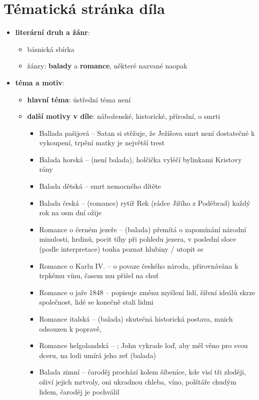 \documentclass[10pt,a4paper]{article}
\begin{document}
\section*{Tématická stránka díla}
\begin{itemize}
\item \textbf{literární druh a žánr}:
	\begin{itemize}
	\item básnická sbírka
	\item žánry: \textbf{balady} a \textbf{romance}, některé nazvané naopak
	\end{itemize}
\item \textbf{téma a motiv}:
	\begin{itemize}
	\item \textbf{hlavní téma}: ústřední téma není
	\item \textbf{další motivy v díle}: náboženské, historické, přírodní, o smrti
		\begin{itemize}
		\item Ballada pašijová -- Satan si stěžuje, že Ježíšova smrt není dostatečné k vykoupení, trpění matky je největší trest
		\item Balada horská -- (není balada), holčička vyléčí bylinkami Kristovy rány
		\item Balada dětská -- smrt nemocného dítěte
		\item Balada česká -- (romance) rytíř Rek (rádce Jiřího z Poděbrad) každý rok na osm dní ožije
		\item Romance o černém jezeře -- (balada) přemítá o zapomínání národní minulosti, hrdinů, pocit tíhy při pohledu jezera, v poslední sloce (podle interpretace) touha poznat hlubiny / utopit se
		\item Romance o Karlu IV. -- o povaze českého národa, přirovnávána k trpkému vínu, časem mu přišel na chuť
		\item Romance o jaře 1848 -- popisuje změnu myšlení lidí, šíření ideálů skrze společnost, lidé se konečně stali lidmi
		\item Romance italská -- (balada) skutečná historická postava, mnich odsouzen k popravě, 
		\item Romance helgolandská -- ; John vykrade loď, aby měl věno pro svou dceru, na lodi umírá jeho zeť (balada) 
		\item Balada zimní -- čaroděj prochází kolem šibeníce, kde visí tři zloději, oživí jejich mrtvoly, oni ukradnou chleba, víno, polštáře chudým lidem, čaroděj je pochválil
			\begin{itemize}

\end{itemize}
\end{itemize}
\end{itemize}
\end{itemize}
\end{document}
